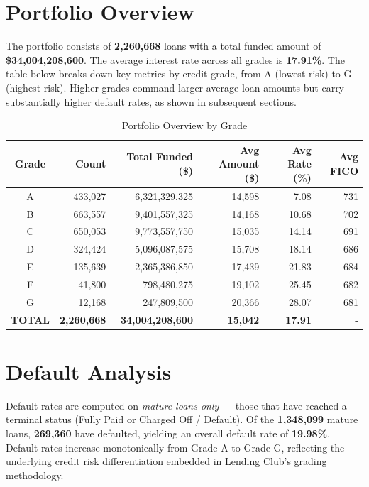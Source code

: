 \documentclass[11pt, a4paper]{article}
\begin{document}
\newpage
\tableofcontents
\newpage

\section{Portfolio Overview}
\label{sec:portfolio}

The portfolio consists of \textbf{2,260,668} loans with a total funded
amount of \textbf{\$34,004,208,600}.  The average interest rate across all
grades is \textbf{17.91\%}.  The table below breaks down key
metrics by credit grade, from A (lowest risk) to G (highest risk).  Higher grades command
larger average loan amounts but carry substantially higher default rates, as shown in
subsequent sections.

\begin{table}[H]
\centering
\caption{Portfolio Overview by Grade}
\begin{tabular}{c r r r r r}
\toprule
\textbf{Grade} & \textbf{Count} & \textbf{Total Funded (\$)} & \textbf{Avg Amount (\$)} & \textbf{Avg Rate (\%)} & \textbf{Avg FICO} \\
\midrule
A & 433,027 & 6,321,329,325 & 14,598 & 7.08 & 731 \\
B & 663,557 & 9,401,557,325 & 14,168 & 10.68 & 702 \\
C & 650,053 & 9,773,557,750 & 15,035 & 14.14 & 691 \\
D & 324,424 & 5,096,087,575 & 15,708 & 18.14 & 686 \\
E & 135,639 & 2,365,386,850 & 17,439 & 21.83 & 684 \\
F & 41,800 & 798,480,275 & 19,102 & 25.45 & 682 \\
G & 12,168 & 247,809,500 & 20,366 & 28.07 & 681 \\
\textbf{TOTAL} & \textbf{2,260,668} & \textbf{34,004,208,600} & \textbf{15,042} & \textbf{17.91} & - \\
\bottomrule
\end{tabular}
\label{tab:portfolio}
\end{table}

\section{Default Analysis}
\label{sec:defaults}

Default rates are computed on \emph{mature loans only} --- those that have reached a terminal
status (Fully Paid or Charged Off / Default).  Of the \textbf{1,348,099}
mature loans, \textbf{269,360} have defaulted, yielding an overall
default rate of \textbf{19.98\%}.  Default rates increase monotonically
from Grade A to Grade G, reflecting the underlying credit risk differentiation embedded in
Lending Club's grading methodology.
\end{document}
